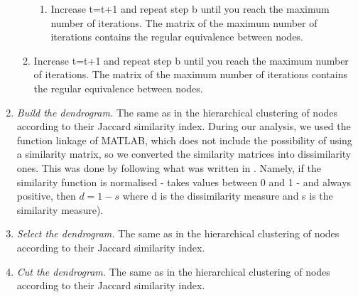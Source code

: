 \documentclass[twocolumn]{article}
\begin{document}
\begin{appendices}
\begin{enumerate}
\begin{enumerate}
\begin{enumerate}
						            \item Increase t=t+1 and repeat step b until you reach the maximum number of iterations. The matrix of the maximum number of iterations contains the regular equivalence between nodes.
					            \end{enumerate}
					      \item Increase t=t+1 and repeat step b until you reach the maximum number of iterations. The matrix of the maximum number of iterations contains the regular equivalence between nodes.
				      \end{enumerate}
				\item \emph{Build the dendrogram.} \smallskip \newline
							The same as in the hierarchical clustering of nodes according to their Jaccard similarity index. During our analysis, we used the function linkage of MATLAB, which does not include the possibility of using a similarity matrix, so we converted the similarity matrices into dissimilarity ones. This was done by following what was written in \citet{VonLuxburg2004}. Namely, if the similarity function is normalised - takes values between 0 and 1 - and always positive, then $d=1-s$ where d is the dissimilarity measure and s is the similarity measure).
				\item \emph{Select the dendrogram.} \smallskip \newline
							The same as in the hierarchical clustering of nodes according to their Jaccard similarity index.
				\item \emph{Cut the dendrogram.} \smallskip \newline
				      The same as in the hierarchical clustering of nodes according to their Jaccard similarity index.
		\end{enumerate}
\end{appendices}
\end{document}
